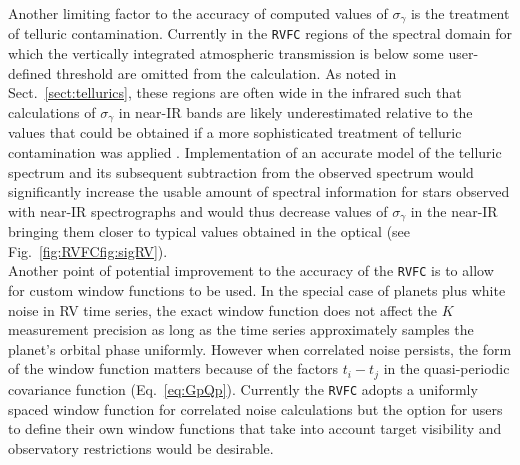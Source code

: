 Another limiting factor to the accuracy of computed values of $\sigma_{\gamma}$
is the treatment of telluric contamination. Currently in the \texttt{RVFC}
regions of the spectral domain for which the vertically integrated atmospheric
transmission is below some user-defined threshold are omitted from the
calculation. As noted in Sect.~\ref{sect:tellurics}, these regions are often
wide in the infrared such that calculations of $\sigma_{\gamma}$ in near-IR
bands are likely underestimated relative to the values that could be obtained
if a more sophisticated treatment of telluric contamination was applied
\citep[e.g.][]{artigau14,bedell19}. Implementation of an accurate model of the
telluric spectrum and its subsequent subtraction from the observed spectrum
would significantly increase the usable amount of spectral information for stars
observed with near-IR spectrographs and would thus decrease values of
$\sigma_{\gamma}$ in the near-IR bringing them closer to typical values obtained
in the optical (see Fig.~\ref{fig:RVFCfig:sigRV}). \\

Another point of potential improvement to the accuracy of the \texttt{RVFC} is
to allow for custom window functions to be used. In the special case of planets
plus white noise in RV time series, the exact window function does not affect the
$K$ measurement precision \sigK{} as long as the time series approximately
samples the planet's orbital phase uniformly. However when correlated noise
persists, the form of the window function matters because of the factors
$t_i-t_j$ in the quasi-periodic covariance function (Eq.~\ref{eq:GpQp}).
Currently the \texttt{RVFC}
adopts a uniformly spaced window function for correlated noise calculations but
the option for users to define their own window functions that take into account
target visibility and observatory restrictions would be desirable.


